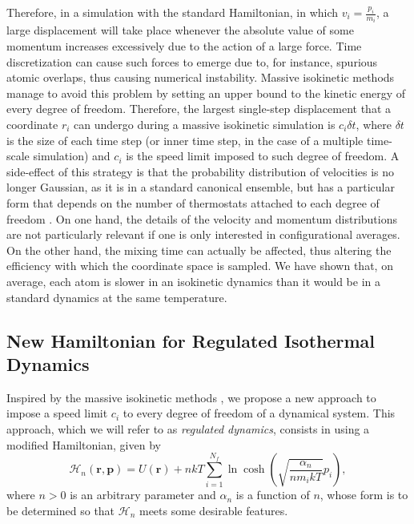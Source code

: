 \documentclass[
aip,
jcp,
reprint,
]{revtex4-1}
\newcommand{\vt}[1]{\boldsymbol{\mathbf{#1}}}          %
\newcommand{\nn}{n}
\begin{document}
Therefore, in a simulation with the standard Hamiltonian, in which $v_i = \frac{p_i}{m_i}$, a large displacement will take place whenever the absolute value of some momentum increases excessively due to the action of a large force.
Time discretization can cause such forces to emerge due to, for instance, spurious atomic overlaps, thus causing numerical instability.
Massive isokinetic methods \cite{Minary_2003a, Minary_2003b, Minary_2004, Leimkuhler_2013} manage to avoid this problem by setting an upper bound to the kinetic energy of every degree of freedom.
Therefore, the largest single-step displacement that a coordinate $r_i$ can undergo during a massive isokinetic simulation is $c_i \delta t$, where $\delta t$ is the size of each time step (or inner time step, in the case of a multiple time-scale simulation) and $c_i$ is the speed limit imposed to such degree of freedom.
A side-effect of this strategy is that the probability distribution of velocities is no longer Gaussian, as it is in a standard canonical ensemble, but has a particular form that depends on the number of thermostats attached to each degree of freedom \cite{Abreu_2020}.
On one hand, the details of the velocity and momentum distributions are not particularly relevant if one is only interested in configurational averages.
On the other hand, the mixing time can actually be affected, thus altering the efficiency with which the coordinate space is sampled.
We have shown \cite{Abreu_2020} that, on average, each atom is slower in an isokinetic dynamics than it would be in a standard dynamics at the same temperature.

\subsection{New Hamiltonian for Regulated Isothermal Dynamics}
\label{sec:new hamiltonian}

Inspired by the massive isokinetic methods \cite{Minary_2003a, Minary_2003b, Minary_2004, Leimkuhler_2013}, we propose a new approach to impose a speed limit $c_i$ to every degree of freedom of a dynamical system.
This approach, which we will refer to as \textit{regulated dynamics}, consists in using a modified Hamiltonian, given by
\begin{equation}
\label{eq:modified hamiltonian}
\mathcal{H}_\nn(\vt r, \vt p) = U(\vt r) + \nn kT \sum_{i=1}^{N_f} \ln \cosh\left(\sqrt{\frac{\alpha_\nn}{\nn m_i k T}} p_i\right),
\end{equation}
where $\nn > 0$ is an arbitrary parameter and $\alpha_\nn$ is a function of $\nn$, whose form is to be determined so that $\mathcal{H}_\nn$ meets some desirable features.
\end{document}
